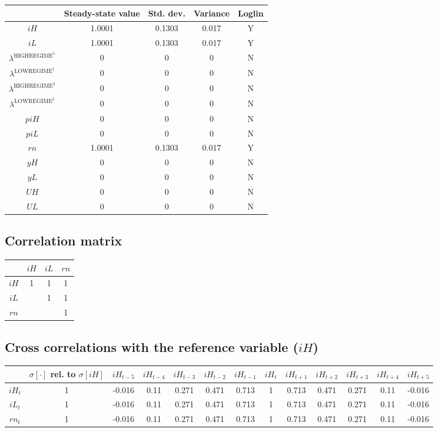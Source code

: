 \begin{tabular}{c|c|c|c|c|}
  & Steady-state value & Std. dev. & Variance & Loglin\\
\hline
${i\!H}$ & 1.0001 & 0.1303 & 0.017 & Y    \\
${i\!L}$ & 1.0001 & 0.1303 & 0.017 & Y    \\
$\lambda^{\mathrm{HIGHREGIME}^{\mathrm{1}}}$ & 0 & 0 & 0 & N    \\
$\lambda^{\mathrm{LOWREGIME}^{\mathrm{1}}}$ & 0 & 0 & 0 & N    \\
$\lambda^{\mathrm{HIGHREGIME}^{\mathrm{2}}}$ & 0 & 0 & 0 & N    \\
$\lambda^{\mathrm{LOWREGIME}^{\mathrm{2}}}$ & 0 & 0 & 0 & N    \\
${p\!i\!H}$ & 0 & 0 & 0 & N    \\
${p\!i\!L}$ & 0 & 0 & 0 & N    \\
${r\!n}$ & 1.0001 & 0.1303 & 0.017 & Y    \\
${y\!H}$ & 0 & 0 & 0 & N    \\
${y\!L}$ & 0 & 0 & 0 & N    \\
${U\!H}$ & 0 & 0 & 0 & N    \\
${U\!L}$ & 0 & 0 & 0 & N    \\
\hline
\end{tabular}


\subsection{Correlation matrix}

\begin{tabular}{c|ccc|}
  & ${i\!H}$ & ${i\!L}$ & ${r\!n}$\\
\hline
${i\!H}$ & 1 & 1 & 1 \\
${i\!L}$ &  & 1 & 1 \\
${r\!n}$ &  &  & 1 \\
\hline
\end{tabular}


\subsection{Cross correlations with the reference variable (${i\!H}$)}

\begin{tabular}{c|c|c|c|c|c|c|c|c|c|c|c|c|}
  & $\sigma[\cdot]$ rel. to $\sigma[{i\!H}]$ & ${i\!H}_{t-5}$ & ${i\!H}_{t-4}$ & ${i\!H}_{t-3}$ & ${i\!H}_{t-2}$ & ${i\!H}_{t-1}$ & ${i\!H}_{t}$ & ${i\!H}_{t+1}$ & ${i\!H}_{t+2}$ & ${i\!H}_{t+3}$ & ${i\!H}_{t+4}$ & ${i\!H}_{t+5}$\\
\hline
${i\!H}_{t}$ & 1 & -0.016 & 0.11 & 0.271 & 0.471 & 0.713 & 1 & 0.713 & 0.471 & 0.271 & 0.11 & -0.016 \\
${i\!L}_{t}$ & 1 & -0.016 & 0.11 & 0.271 & 0.471 & 0.713 & 1 & 0.713 & 0.471 & 0.271 & 0.11 & -0.016 \\
${r\!n}_{t}$ & 1 & -0.016 & 0.11 & 0.271 & 0.471 & 0.713 & 1 & 0.713 & 0.471 & 0.271 & 0.11 & -0.016 \\
\hline
\end{tabular}


